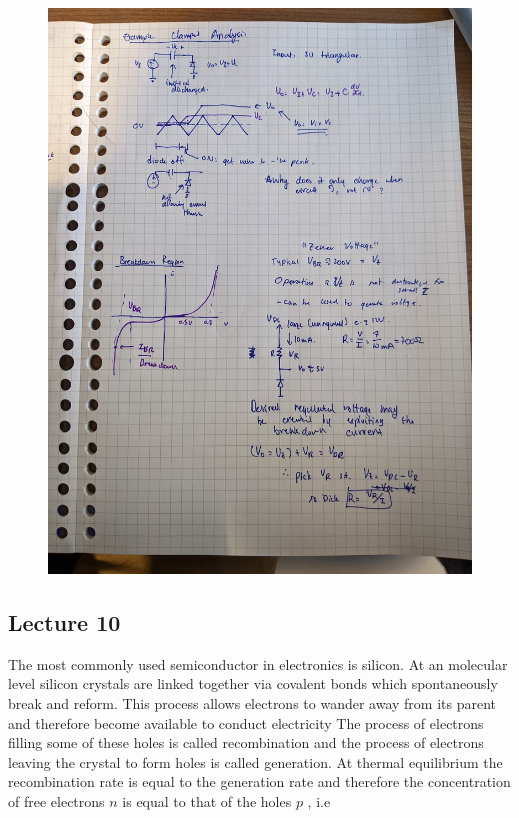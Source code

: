 \documentclass[../notes.tex]{subfiles}
\begin{document}
\begin{fullpage}
\begin{figure}[H]
	\centering
	\includegraphics[width=\linewidth]{img/image_2022-09-29-16-34-15.png}
\end{figure}
\end{fullpage}

\subsection{Lecture 10}

The most commonly used semiconductor in electronics is silicon.
At an molecular level silicon crystals are linked together via covalent bonds which spontaneously break and reform.
This process allows electrons to wander away from its parent and therefore become available to conduct electricity
The process of electrons filling some of these holes is called recombination and the process of electrons leaving the crystal to form holes is called generation. At thermal equilibrium the recombination rate is equal to the generation rate and therefore the concentration of free electrons $ n $ is equal to that of the holes $ p $ , i.e 
\end{document}

